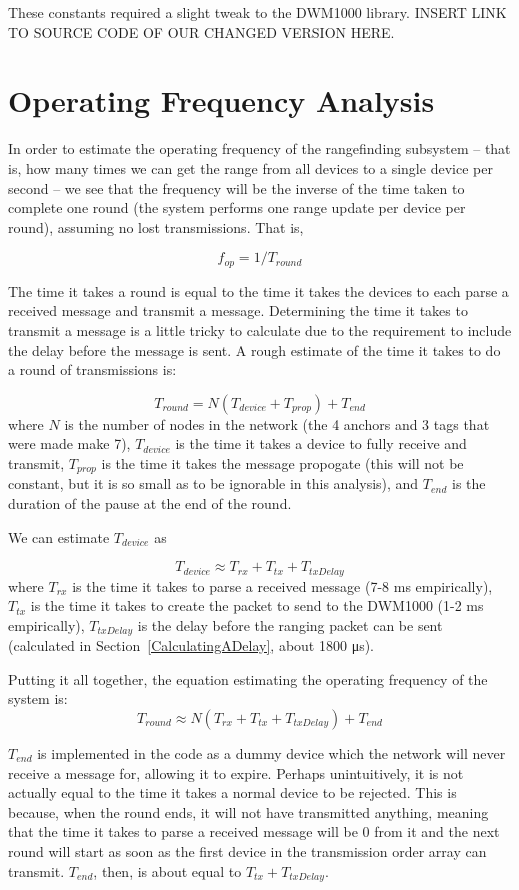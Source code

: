 These constants required a slight tweak to the DWM1000 library. INSERT LINK TO SOURCE CODE OF OUR CHANGED VERSION HERE.

\section{Operating Frequency Analysis}
\label{OperatingFrequencyAnalysis}
In order to estimate the operating frequency of the rangefinding subsystem -- that is, how many times we can get the range from all devices to a single device per second -- we see that the frequency will be the inverse of the time taken to complete one round (the system performs one range update per device per round), assuming no lost transmissions. That is,

\[
 	f_{op} = 1/T_{round}
\]

The time it takes a round is equal to the time it takes the devices to each parse a received message and transmit a message. Determining the time it takes to transmit a message is a little tricky to calculate due to the requirement to include the delay before the message is sent. A rough estimate of the time it takes to do a round of transmissions is:

\[
	T_{round} =  N(T_{device} + T_{prop}) + T_{end}
\]
where $N$ is the number of nodes in the network (the 4 anchors and 3 tags that were made make 7), $T_{device}$ is the time it takes a device to fully receive and transmit, $T_{prop}$ is the time it takes the message propogate (this will not be constant, but it is so small as to be ignorable in this analysis), and $T_{end}$ is the duration of the pause at the end of the round. 

We can estimate $T_{device}$ as

\[
	T_{device} \approx T_{rx} + T_{tx} + T_{txDelay}
\]
where $T_{rx}$ is the time it takes to parse a received message (7-8 ms empirically), $T_{tx}$ is the time it takes to create the packet to send to the DWM1000 (1-2 ms empirically), $T_{txDelay}$ is the delay before the ranging packet can be sent (calculated in Section~\ref{CalculatingADelay}, about 1800 \si{\micro\second}).

Putting it all together, the equation estimating the operating frequency of the system is:
\[
	T_{round} \approx N(T_{rx} + T_{tx} + T_{txDelay}) + T_{end}
\]

$T_{end}$ is implemented in the code as a dummy device which the network will never receive a message for, allowing it to expire. Perhaps unintuitively, it is not actually equal to the time it takes a normal device to be rejected. This is because, when the round ends, it will not have transmitted anything, meaning that the time it takes to parse a received message will be 0 from it and the next round will start as soon as the first device in the transmission order array can transmit. $T_{end}$, then, is about equal to $T_{tx} + T_{txDelay}$.

